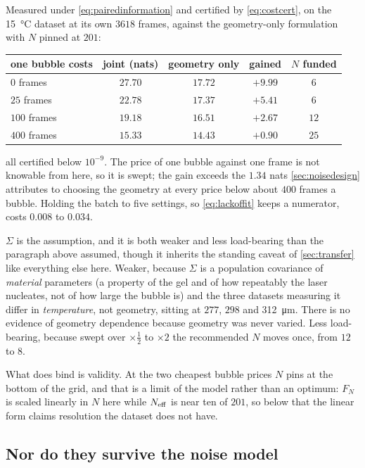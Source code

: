 \documentclass[10pt]{article}
\begin{document}
Measured under \eqref{eq:pairedinformation} and certified by \eqref{eq:costcert}, on the
\SI{15}{\celsius} dataset at its own $3618$ frames, against the geometry-only formulation with
$N$ pinned at $201$:

\begin{center}
\begin{tabular}{lcccc}
\toprule
one bubble costs & joint (nats) & geometry only & gained & $N$ funded \\
\midrule
$0$ frames & $27.70$ & $17.72$ & $\mathbf{+9.99}$ & $6$ \\
$25$ frames & $22.78$ & $17.37$ & $+5.41$ & $6$ \\
$100$ frames & $19.18$ & $16.51$ & $+2.67$ & $12$ \\
$400$ frames & $15.33$ & $14.43$ & $+0.90$ & $25$ \\
\bottomrule
\end{tabular}
\end{center}

\noindent all certified below $10^{-9}$. The price of one bubble against one frame is not
knowable from here, so it is swept; the gain exceeds the $1.34$ nats \cref{sec:noisedesign}
attributes to choosing the geometry at every price below about $400$ frames a bubble. Holding the
batch to five settings, so \eqref{eq:lackoffit} keeps a numerator, costs $0.008$ to $0.034$.

$\Sigma$ is the assumption, and it is both weaker and less load-bearing than the paragraph above
assumed, though it inherits the standing caveat of \cref{sec:transfer} like everything else
here. Weaker, because $\Sigma$ is a population covariance of \emph{material} parameters (a
property of the gel and of how repeatably the laser nucleates, not of how large the bubble is) and the three datasets measuring it differ in \emph{temperature}, not geometry, sitting at $277$,
$298$ and \SI{312}{\micro\metre}. There is no evidence of geometry dependence because geometry
was never varied. Less load-bearing, because swept over $\times\tfrac12$ to $\times2$ the
recommended $N$ moves once, from $12$ to $8$.

What does bind is validity. At the two cheapest bubble prices $N$ pins at the bottom of the grid,
and that is a limit of the model rather than an optimum: $F_N$ is scaled linearly in $N$ here
while $N_{\rm eff}$ is near ten of $201$, so below that the linear form claims resolution the
dataset does not have.

\subsection*{Nor do they survive the noise model}
\label{sec:noisedesign}
\end{document}
